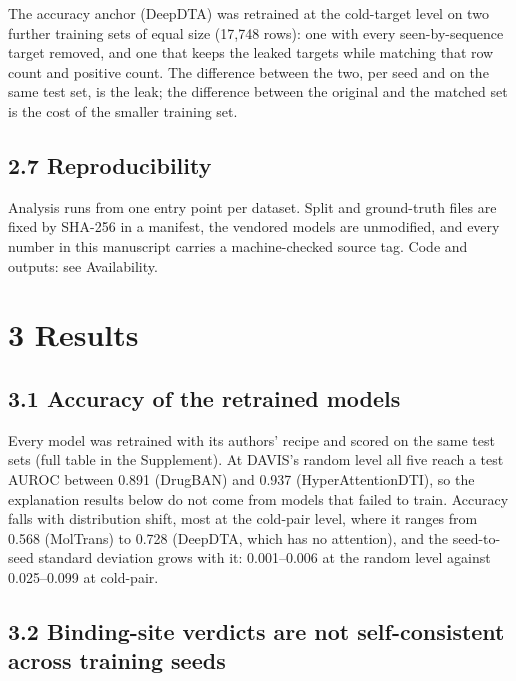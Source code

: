 \documentclass[
  11pt,
]{article}
\begin{document}
The accuracy anchor (DeepDTA) was retrained at the cold-target level on two further training sets of equal size (17,748 rows): one with every seen-by-sequence target removed, and one that keeps the leaked targets while matching that row count and positive count. The difference between the two, per seed and on the same test set, is the leak; the difference between the original and the matched set is the cost of the smaller training set.

\subsection{2.7 Reproducibility}\label{reproducibility}

Analysis runs from one entry point per dataset. Split and ground-truth files are fixed by SHA-256 in a manifest, the vendored models are unmodified, and every number in this manuscript carries a machine-checked source tag. Code and outputs: see Availability.

\section{3 Results}\label{results}

\subsection{3.1 Accuracy of the retrained models}\label{accuracy-of-the-retrained-models}

Every model was retrained with its authors' recipe and scored on the same test sets (full table in the Supplement). At DAVIS's random level all five reach a test AUROC between 0.891 (DrugBAN) and 0.937 (HyperAttentionDTI), so the explanation results below do not come from models that failed to train. Accuracy falls with distribution shift, most at the cold-pair level, where it ranges from 0.568 (MolTrans) to 0.728 (DeepDTA, which has no attention), and the seed-to-seed standard deviation grows with it: 0.001--0.006 at the random level against 0.025--0.099 at cold-pair.

\subsection{3.2 Binding-site verdicts are not self-consistent across training seeds}\label{binding-site-verdicts-are-not-self-consistent-across-training-seeds}
\end{document}
